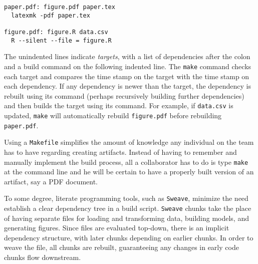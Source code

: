 \documentclass[]{article}
\begin{document}
\begin{verbatim}
paper.pdf: figure.pdf paper.tex
  latexmk -pdf paper.tex

figure.pdf: figure.R data.csv
  R --silent --file = figure.R
\end{verbatim}

The unindented lines indicate \emph{targets}, with a list of dependencies
after the colon and a build command on the following indented line.
The \texttt{make} command checks each target and compares the
time stamp on the target with the time stamp on each dependency. If any
dependency is newer than the target, the dependency is rebuilt using its
command (perhaps recursively building further dependencies) and then builds
the target using its command. For example, if \texttt{data.csv} is updated,
\texttt{make} will automatically rebuild \texttt{figure.pdf} before rebuilding
\texttt{paper.pdf}.

Using a \texttt{Makefile} simplifies the amount of knowledge any individual on
the team has to have regarding creating artifacts. Instead of having to
remember and manually implement the build process, all a collaborator has to
do is type \texttt{make} at the command line and he will be certain to have a
properly built version of an artifact, say a PDF document.

To some degree, literate programming tools, such as \texttt{Sweave}, minimize
the need establish a clear dependency tree in a build script. \texttt{Sweave}
chunks take the place of
having separate files for loading and transforming data, building models, and
generating figures. Since files are evaluated top-down, there is an implicit
dependency structure, with later chunks depending on earlier chunks. In order
to weave the file, all chunks are rebuilt, guaranteeing any changes in early
code chunks flow downstream.
\end{document}
